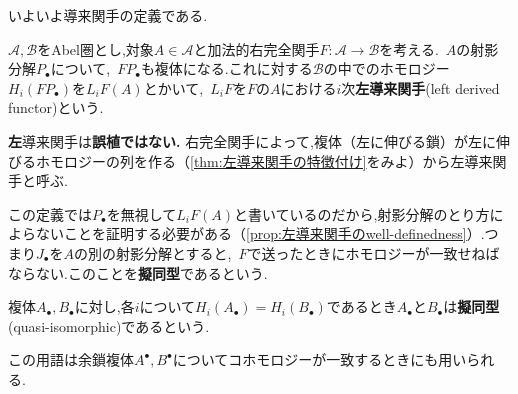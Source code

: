 いよいよ導来関手の定義である.
\begin{defi}[左導来関手]
	$\mathscr{A,B}$をAbel圏とし,対象$A\in\mathscr{A}$と加法的右完全関手$F:\mathscr{A}\to\mathscr{B}$を考える.~$A$の射影分解$P_\bullet$について,~$F P_\bullet$も複体になる.これに対する$\mathscr{B}$の中でのホモロジー$H_i(F P_\bullet)$を$L_i F (A)$とかいて,~$L_iF$を$F$の$A$における$i$次\textbf{左導来関手}(left derived functor)という.
\end{defi}

\textbf{左}導来関手は\textbf{誤植ではない.} 右完全関手によって,複体（左に伸びる鎖）が左に伸びるホモロジーの列を作る（\ref{thm:左導来関手の特徴付け}をみよ）から左導来関手と呼ぶ.

この定義では$P_\bullet$を無視して$L_i F(A)$と書いているのだから,射影分解のとり方によらないことを証明する必要がある（\ref{prop:左導来関手のwell-definedness}）.つまり$J_\bullet$を$A$の別の射影分解とすると,~$F$で送ったときにホモロジーが一致せねばならない.このことを\textbf{擬同型}であるという.

\begin{defi}[擬同型]
	複体$A_\bullet,B_\bullet$に対し,各$i$について$H_i(A_\bullet)=H_i(B_\bullet)$であるとき$A_\bullet$と$B_\bullet$は\textbf{擬同型}(quasi-isomorphic)であるという.
\end{defi}

この用語は余鎖複体$A^\bullet,B^\bullet$についてコホモロジーが一致するときにも用いられる.

